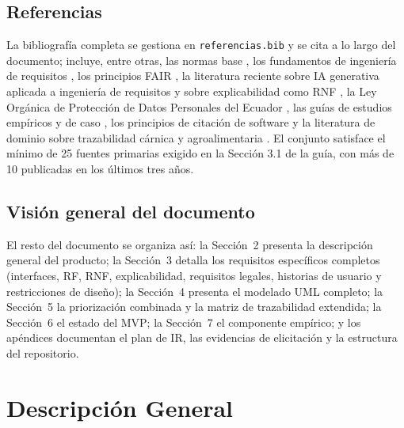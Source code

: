 \documentclass[11pt,a4paper]{article}
\begin{document}
\subsection{Referencias}
La bibliografía completa se gestiona en \texttt{referencias.bib} y se cita a lo largo del documento; incluye, entre otras, las normas base \cite{iso29148,iso25010}, los fundamentos de ingeniería de requisitos \cite{pohl2010,swebok2024}, los principios FAIR \cite{wilkinson2016fair}, la literatura reciente sobre IA generativa aplicada a ingeniería de requisitos \cite{cheng2026genai,arora2024genai,vogelsang2024llm} y sobre explicabilidad como RNF \cite{chazette2020explainability,chazette2021exploring,chazette2022explainable}, la Ley Orgánica de Protección de Datos Personales del Ecuador \cite{lopd2021}, las guías de estudios empíricos y de caso \cite{molleri2020checklist,hennink2017saturation,hagaman2017interviews,guest2006interviews,runeson2009casestudy,mendez2017naming,jedlitschka2008reporting,wohlin2012experimentation,nosek2018preregistration,montgomery2022requirementsquality,cohen1960kappa,fleiss1971kappa,ferrari2016ambiguity,fischbach2023acceptance,kitchenham2007slr}, los principios de citación de software \cite{smith2016softwarecitation,druskat2021cff} y la literatura de dominio sobre trazabilidad cárnica y agroalimentaria \cite{chen2021blockchain,beck2021blockchainmeat,varavallo2022greenblockchain,escalona2022traceability,demi2021blockchaintraceability}. El conjunto satisface el mínimo de 25 fuentes primarias exigido en la Sección 3.1 de la guía, con más de 10 publicadas en los últimos tres años.

\subsection{Visión general del documento}
El resto del documento se organiza así: la Sección~2 presenta la descripción general del producto; la Sección~3 detalla los requisitos específicos completos (interfaces, RF, RNF, explicabilidad, requisitos legales, historias de usuario y restricciones de diseño); la Sección~4 presenta el modelado UML completo; la Sección~5 la priorización combinada y la matriz de trazabilidad extendida; la Sección~6 el estado del MVP; la Sección~7 el componente empírico; y los apéndices documentan el plan de IR, las evidencias de elicitación y la estructura del repositorio.

\section{Descripción General}
\end{document}

